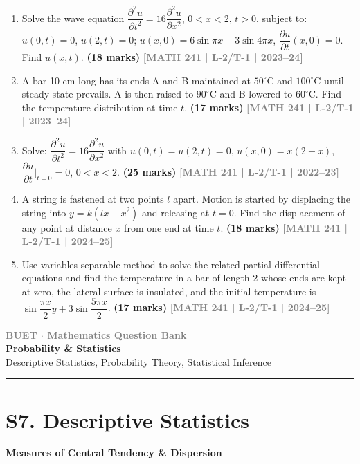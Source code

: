 \documentclass[12pt,a4paper]{article}
\newcommand{\yr}[1]{\hfill\textcolor{gray}{\small\textbf{[#1]}}}
\newcommand{\mk}[1]{\textcolor{orange!70!black}{\small\textbf{(#1 marks)}}}
\newcommand{\subtopic}[2]{%
  \vspace{10pt}
  \noindent\begin{tcolorbox}[colback=#1!8,colframe=#1,boxrule=0.6pt,arc=4pt,
    left=6pt,right=6pt,top=4pt,bottom=4pt]
    \small\bfseries\textcolor{#1}{#2}
  \end{tcolorbox}
  \vspace{2pt}
}
\newcommand{\secdivider}[3]{%
  \newpage\thispagestyle{empty}%
  \vspace*{\fill}%
  \begin{tcolorbox}[enhanced,colback=#3!6,colframe=#3,boxrule=1.5pt,arc=8pt,
    left=20pt,right=20pt,top=22pt,bottom=22pt,
    shadow={3pt}{-3pt}{0pt}{black!15}]
    \centering
    {\large\textcolor{gray}{\textbf{BUET $\cdot$ Mathematics Question Bank}}}\\[8pt]
    {\fontsize{26}{32}\selectfont\bfseries\textcolor{#3}{#1}}\\[6pt]
    {\fontsize{15}{19}\selectfont\textcolor{dgray}{#2}}\\[12pt]
    \textcolor{#3!60}{\rule{0.5\textwidth}{0.5pt}}
  \end{tcolorbox}%
  \vspace*{\fill}\newpage%
}
\begin{document}
\begin{enumerate}
\item Solve the wave equation $\dfrac{\partial^{2}u}{\partial t^{2}}=16\dfrac{\partial^{2}u}{\partial x^{2}}$, $0<x<2$, $t>0$, subject to: $u(0,t)=0$, $u(2,t)=0$; $u(x,0)=6\sin\pi x-3\sin 4\pi x$, $\dfrac{\partial u}{\partial t}(x,0)=0$. Find $u(x,t)$.
\mk{18} \yr{MATH 241 | L-2/T-1 | 2023--24}

\item A bar 10 cm long has its ends A and B maintained at $50^{\circ}$C and $100^{\circ}$C until steady state prevails. A is then raised to $90^{\circ}$C and B lowered to $60^{\circ}$C. Find the temperature distribution at time $t$.
\mk{17} \yr{MATH 241 | L-2/T-1 | 2023--24}

\item Solve: $\dfrac{\partial^{2}u}{\partial t^{2}}=16\dfrac{\partial^{2}u}{\partial x^{2}}$ with $u(0,t)=u(2,t)=0$, $u(x,0)=x(2-x)$, $\dfrac{\partial u}{\partial t}\big|_{t=0}=0$, $0<x<2$.
\mk{25} \yr{MATH 241 | L-2/T-1 | 2022--23}

\item A string is fastened at two points $l$ apart. Motion is started by displacing the string into $y=k(lx-x^{2})$ and releasing at $t=0$. Find the displacement of any point at distance $x$ from one end at time $t$.
\mk{18} \yr{MATH 241 | L-2/T-1 | 2024--25}

\item Use variables separable method to solve the related partial differential equations and find the temperature in a bar of length 2 whose ends are kept at zero, the lateral surface is insulated, and the initial temperature is $\sin\dfrac{\pi x}{2}y+3\sin\dfrac{5\pi x}{2}$.
\mk{17} \yr{MATH 241 | L-2/T-1 | 2024--25}

\end{enumerate}


\secdivider{Probability \& Statistics}{Descriptive Statistics, Probability Theory, Statistical Inference}{cG}

\section{S7. Descriptive Statistics}
\label{sec:S7}

\subtopic{cG}{Measures of Central Tendency \& Dispersion}
\label{sub:s7-central}
\end{document}
